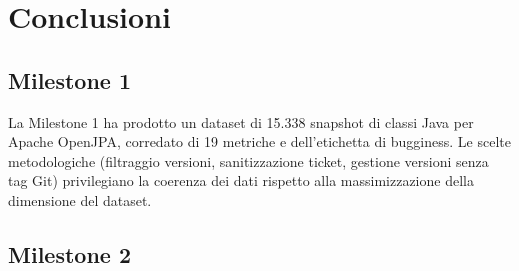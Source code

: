 \section{Conclusioni}

\subsection{Milestone 1}

La Milestone 1 ha prodotto un dataset di 15.338 snapshot di classi Java per Apache OpenJPA,
corredato di 19 metriche e dell'etichetta di bugginess. Le scelte metodologiche (filtraggio
versioni, sanitizzazione ticket, gestione versioni senza tag Git) privilegiano
la coerenza dei dati rispetto alla massimizzazione della dimensione del dataset.

\subsection{Milestone 2}

